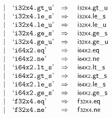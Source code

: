 $$\begin{array}[t]{@{}lrrl@{}l@{}l@{}l@{}}
& & | & \mbox{‘\texttt{i32x4.gt\_u}’} & \quad\Rightarrow\quad{} & {\mathsf{i{\scriptstyle 32}}}{\mathsf{x}}{\mathsf{{\scriptstyle 4}}} {.} {\mathsf{gt}}{\mathsf{\_}}{\mathsf{u}} \\
& & | & \mbox{‘\texttt{i32x4.le\_s}’} & \quad\Rightarrow\quad{} & {\mathsf{i{\scriptstyle 32}}}{\mathsf{x}}{\mathsf{{\scriptstyle 4}}} {.} {\mathsf{le}}{\mathsf{\_}}{\mathsf{s}} \\
& & | & \mbox{‘\texttt{i32x4.le\_u}’} & \quad\Rightarrow\quad{} & {\mathsf{i{\scriptstyle 32}}}{\mathsf{x}}{\mathsf{{\scriptstyle 4}}} {.} {\mathsf{le}}{\mathsf{\_}}{\mathsf{u}} \\
& & | & \mbox{‘\texttt{i32x4.ge\_s}’} & \quad\Rightarrow\quad{} & {\mathsf{i{\scriptstyle 32}}}{\mathsf{x}}{\mathsf{{\scriptstyle 4}}} {.} {\mathsf{ge}}{\mathsf{\_}}{\mathsf{s}} \\
& & | & \mbox{‘\texttt{i32x4.ge\_u}’} & \quad\Rightarrow\quad{} & {\mathsf{i{\scriptstyle 32}}}{\mathsf{x}}{\mathsf{{\scriptstyle 4}}} {.} {\mathsf{ge}}{\mathsf{\_}}{\mathsf{u}} \\
& & | & \mbox{‘\texttt{i64x2.eq}’} & \quad\Rightarrow\quad{} & {\mathsf{i{\scriptstyle 64}}}{\mathsf{x}}{\mathsf{{\scriptstyle 2}}} {.} \mathsf{eq} \\
& & | & \mbox{‘\texttt{i64x2.ne}’} & \quad\Rightarrow\quad{} & {\mathsf{i{\scriptstyle 64}}}{\mathsf{x}}{\mathsf{{\scriptstyle 2}}} {.} \mathsf{ne} \\
& & | & \mbox{‘\texttt{i64x2.lt\_s}’} & \quad\Rightarrow\quad{} & {\mathsf{i{\scriptstyle 64}}}{\mathsf{x}}{\mathsf{{\scriptstyle 2}}} {.} {\mathsf{lt}}{\mathsf{\_}}{\mathsf{s}} \\
& & | & \mbox{‘\texttt{i64x2.gt\_s}’} & \quad\Rightarrow\quad{} & {\mathsf{i{\scriptstyle 64}}}{\mathsf{x}}{\mathsf{{\scriptstyle 2}}} {.} {\mathsf{gt}}{\mathsf{\_}}{\mathsf{s}} \\
& & | & \mbox{‘\texttt{i64x2.le\_s}’} & \quad\Rightarrow\quad{} & {\mathsf{i{\scriptstyle 64}}}{\mathsf{x}}{\mathsf{{\scriptstyle 2}}} {.} {\mathsf{le}}{\mathsf{\_}}{\mathsf{s}} \\
& & | & \mbox{‘\texttt{i64x2.ge\_s}’} & \quad\Rightarrow\quad{} & {\mathsf{i{\scriptstyle 64}}}{\mathsf{x}}{\mathsf{{\scriptstyle 2}}} {.} {\mathsf{ge}}{\mathsf{\_}}{\mathsf{s}} \\
& & | & \mbox{‘\texttt{f32x4.eq}’} & \quad\Rightarrow\quad{} & {\mathsf{f{\scriptstyle 32}}}{\mathsf{x}}{\mathsf{{\scriptstyle 4}}} {.} \mathsf{eq} \\
& & | & \mbox{‘\texttt{f32x4.ne}’} & \quad\Rightarrow\quad{} & {\mathsf{f{\scriptstyle 32}}}{\mathsf{x}}{\mathsf{{\scriptstyle 4}}} {.} \mathsf{ne} \\

\end{array}$$
